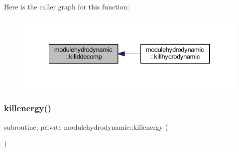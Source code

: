 Here is the caller graph for this function\+:\nopagebreak
\begin{figure}[H]
\begin{center}
\leavevmode
\includegraphics[width=334pt]{namespacemodulehydrodynamic_afcb6ada5d2c8c5ce856cc9efcbb38077_icgraph}
\end{center}
\end{figure}
\mbox{\label{namespacemodulehydrodynamic_a85ec37a513035b769326676058893ac1}} 
\subsubsection{\texorpdfstring{killenergy()}{killenergy()}}
{\footnotesize\ttfamily subroutine, private modulehydrodynamic\+::killenergy (\begin{DoxyParamCaption}{ }\end{DoxyParamCaption})\hspace{0.3cm}{\ttfamily [private]}}

